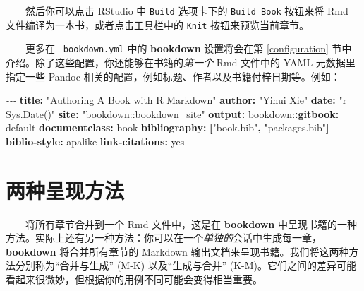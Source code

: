 \documentclass[
  12pt,
]{krantz}
\newenvironment{Shaded}{\begin{snugshade}}{\end{snugshade}}
\newcommand{\AttributeTok}[1]{\textcolor[rgb]{0.13,0.29,0.53}{#1}}
\newcommand{\CharTok}[1]{\textcolor[rgb]{0.31,0.60,0.02}{#1}}
\newcommand{\FunctionTok}[1]{\textcolor[rgb]{0.13,0.29,0.53}{\textbf{#1}}}
\newcommand{\KeywordTok}[1]{\textcolor[rgb]{0.13,0.29,0.53}{\textbf{#1}}}
\newcommand{\PreprocessorTok}[1]{\textcolor[rgb]{0.56,0.35,0.01}{\textit{#1}}}
\newcommand{\StringTok}[1]{\textcolor[rgb]{0.31,0.60,0.02}{#1}}
\theoremstyle{definition}
\theoremstyle{definition}
\theoremstyle{definition}
\theoremstyle{definition}
\theoremstyle{remark}
\begin{document}
  然后你可以点击 RStudio 中 \texttt{Build} 选项卡下的 \texttt{Build\ Book} 按钮来将 Rmd 文件编译为一本书，或者点击工具栏中的 \texttt{Knit} 按钮来预览当前章节。

  更多在 \texttt{\_bookdown.yml} 中的 \textbf{bookdown} 设置将会在第 \ref{configuration} 节中介绍。除了这些配置，你还能够在书籍的\emph{第一个} Rmd 文件中的 YAML 元数据里指定一些 Pandoc 相关的配置，例如标题、作者以及书籍付梓日期等。例如：

\begin{Shaded}
\begin{Highlighting}[]
\PreprocessorTok{{-}{-}{-} }
\FunctionTok{title}\KeywordTok{:}\AttributeTok{ }\StringTok{"Authoring A Book with R Markdown"}
\FunctionTok{author}\KeywordTok{:}\AttributeTok{ }\StringTok{"Yihui Xie"}
\FunctionTok{date}\KeywordTok{:}\AttributeTok{ }\StringTok{"\textasciigrave{}r Sys.Date()\textasciigrave{}"}
\FunctionTok{site}\KeywordTok{:}\AttributeTok{ }\StringTok{"bookdown::bookdown\_site"}
\FunctionTok{output}\KeywordTok{:}
\AttributeTok{  bookdown:}\FunctionTok{:gitbook}\KeywordTok{:}\AttributeTok{ default}
\FunctionTok{documentclass}\KeywordTok{:}\AttributeTok{ book}
\FunctionTok{bibliography}\KeywordTok{:}\AttributeTok{ }\KeywordTok{[}\StringTok{"book.bib"}\KeywordTok{,}\AttributeTok{ }\StringTok{"packages.bib"}\KeywordTok{]}
\FunctionTok{biblio{-}style}\KeywordTok{:}\AttributeTok{ apalike}
\FunctionTok{link{-}citations}\KeywordTok{:}\AttributeTok{ }\CharTok{yes}
\PreprocessorTok{{-}{-}{-}}
\end{Highlighting}
\end{Shaded}

\hypertarget{new-session}{%
\section{两种呈现方法}\label{new-session}}

  将所有章节合并到一个 Rmd 文件中，这是在 \textbf{bookdown} 中呈现书籍的一种方法。实际上还有另一种方法：你可以在一个\emph{单独的}会话中生成每一章，\textbf{bookdown} 将合并所有章节的 Markdown 输出文档来呈现书籍。我们将这两种方法分别称为``合并与生成'' (M-K) 以及``生成与合并'' (K-M)。它们之间的差异可能看起来很微妙，但根据你的用例不同可能会变得相当重要。
\end{document}

